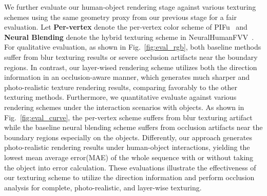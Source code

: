 \begin{table}[t]
	\begin{center}
		\centering
		\caption{Quantitative evaluation of occlusion-aware human reconstruction scheme on synthetic data. }
		\vspace{-10pt}
		\label{tab:Evaluations}
		\vspace{-10pt}
	\end{center}
\end{table}



We further evaluate our human-object rendering stage against various texturing schemes using the same geometry proxy from our previous stage for a fair evaluation.
%
Let \textbf{Per-vertex} denote the per-vertex color scheme of PIFu~\cite{PIFU_2019ICCV} and \textbf{Neural Blending} denote the hybrid texturing scheme in NeuralHumanFVV~\cite{NeuralHumanFVV2021CVPR}. 
%
For qualitative evaluation, as shown in Fig.~\ref{fig:eval_rgb}, both baseline methods suffer from blur texturing results or severe occlusion artifacts near the boundary regions.
%
In contrast, our layer-wised rendering scheme utilizes both the direction information in an occlusion-aware manner, which generates much sharper and photo-realistic texture rendering results, comparing favorably to the other texturing methods.
%
Furthermore, we quantitative evaluate against various rendering schemes under the interaction scenarios with objects.
%
As shown in Fig.~\ref{fig:eval_curve}, the per-vertex scheme suffers from blur texturing artifact while the baseline neural blending scheme suffers from 
occlusion artifacts near the boundary regions especially on the objects.
%
Differently, our approach generates photo-realistic rendering results under human-object interactions, yielding the lowest mean average error(MAE) of the whole sequence with or without taking the object into error calculation.
%
These evaluations illustrate the effectiveness of our texturing scheme to utilize the direction information and perform occlusion analysis for complete, photo-realistic, and layer-wise texturing.

